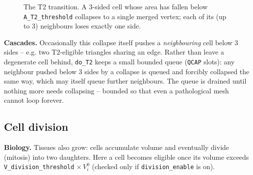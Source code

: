 \documentclass[11pt,a4paper]{report}
\begin{document}
\begin{figure}[h]
\centering
{}
\caption{The T2 transition. A 3-sided cell whose area has fallen below
\texttt{A\_T2\_threshold} collapses to a single merged vertex; each of
its (up to 3) neighbours loses exactly one side.}
\label{fig:T2}
\end{figure}

\textbf{Cascades.} Occasionally this collapse itself pushes a
\emph{neighbouring} cell below 3 sides -- e.g. two T2-eligible triangles
sharing an edge. Rather than leave a degenerate cell behind,
\texttt{do\_T2} keeps a small bounded queue (\texttt{QCAP} slots): any
neighbour pushed below 3 sides by a collapse is queued and forcibly
collapsed the same way, which may itself queue further neighbours. The
queue is drained until nothing more needs collapsing -- bounded so that
even a pathological mesh cannot loop forever.

\subsection{Cell division}
\label{sec:division}
\textbf{Biology.} Tissues also grow: cells accumulate volume and
eventually divide (mitosis) into two daughters. Here a cell becomes
eligible once its volume exceeds
\texttt{V\_division\_threshold}$\,\times V_i^0$ (checked only if
\texttt{division\_enable} is on).
\end{document}
